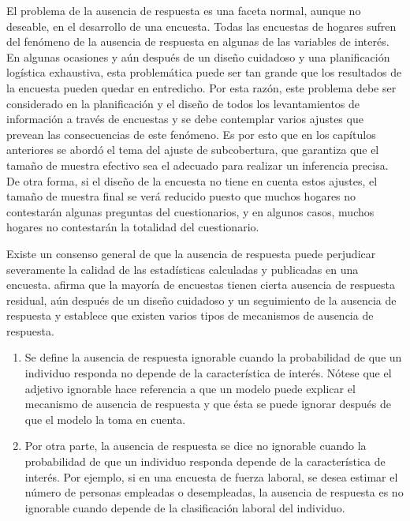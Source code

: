 \documentclass[
  12pt,
  spanish,
]{book}
\providecommand{\tightlist}{%
  \setlength{\itemsep}{0pt}\setlength{\parskip}{0pt}}
\begin{document}
El problema de la ausencia de respuesta es una faceta normal, aunque no deseable, en el desarrollo de una encuesta. Todas las encuestas de hogares sufren del fenómeno de la ausencia de respuesta en algunas de las variables de interés. En algunas ocasiones y aún después de un diseño cuidadoso y una planificación logística exhaustiva, esta problemática puede ser tan grande que los resultados de la encuesta pueden quedar en entredicho. Por esta razón, este problema debe ser considerado en la planificación y el diseño de todos los levantamientos de información a través de encuestas y se debe contemplar varios ajustes que prevean las consecuencias de este fenómeno. Es por esto que en los capítulos anteriores se abordó el tema del ajuste de subcobertura, que garantiza que el tamaño de muestra efectivo sea el adecuado para realizar un inferencia precisa. De otra forma, si el diseño de la encuesta no tiene en cuenta estos ajustes, el tamaño de muestra final se verá reducido puesto que muchos hogares no contestarán algunas preguntas del cuestionarios, y en algunos casos, muchos hogares no contestarán la totalidad del cuestionario.

Existe un consenso general de que la ausencia de respuesta puede perjudicar severamente la calidad de las estadísticas calculadas y publicadas en una encuesta. \citet{Lohr_2019} afirma que la mayoría de encuestas tienen cierta ausencia de respuesta residual, aún después de un diseño cuidadoso y un seguimiento de la ausencia de respuesta y establece que existen varios tipos de mecanismos de ausencia de respuesta.

\begin{enumerate}
\def\labelenumi{\arabic{enumi}.}
\tightlist
\item
  Se define la ausencia de respuesta ignorable cuando la probabilidad de que un individuo responda no depende de la característica de interés. Nótese que el adjetivo ignorable hace referencia a que un modelo puede explicar el mecanismo de ausencia de respuesta y que ésta se puede ignorar después de que el modelo la toma en cuenta.
\item
  Por otra parte, la ausencia de respuesta se dice no ignorable cuando la probabilidad de que un individuo responda depende de la característica de interés. Por ejemplo, si en una encuesta de fuerza laboral, se desea estimar el número de personas empleadas o desempleadas, la ausencia de respuesta es no ignorable cuando depende de la clasificación laboral del individuo.
\end{enumerate}
\end{document}
